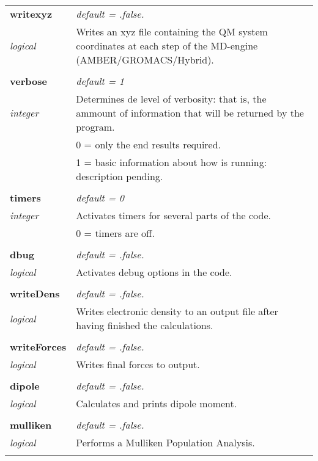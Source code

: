 \begin{Spacing}{1.0}
\begin{longtable}{ p{} p{} }
   \textbf{writexyz}
   &  \textit{default = .false. }
   \\*\textit{logical}
   & Writes an xyz file containing the QM system
   coordinates at each step of the MD-engine
   (AMBER/GROMACS/Hybrid).\\* \\

   \textbf{verbose}
   &  \textit{default = 1 }
   \\*\textit{integer}
   & Determines de level of verbosity: that is, the
   ammount of    information that will be returned by
   the program.\\*
   &     0 = only the end results required.\\*
   &     1 = basic information about how is running:
   description pending.\\* \\

   \textbf{timers}
   &  \textit{default = 0}
   \\*\textit{integer}
   & Activates timers for several parts of the code.\\*
   &     0 = timers are off.\\* \\

   \textbf{dbug}
   &  \textit{default = .false. }
   \\*\textit{logical}
   & Activates debug options in the code.\\* \\

   \textbf{writeDens}
   &  \textit{default = .false. }
   \\*\textit{logical}
   & Writes electronic density to an output file after
   having finished the calculations.\\* \\

   \textbf{writeForces}
   &  \textit{default = .false. }
   \\*\textit{logical}
   & Writes final forces to output.\\* \\

   \textbf{dipole}
   &  \textit{default = .false. }
   \\*\textit{logical}
   & Calculates and prints dipole moment.\\* \\

   \textbf{mulliken}
   &  \textit{default = .false. }
   \\*\textit{logical}
   & Performs a Mulliken Population Analysis.\\* \\


\end{longtable}
\end{Spacing}
